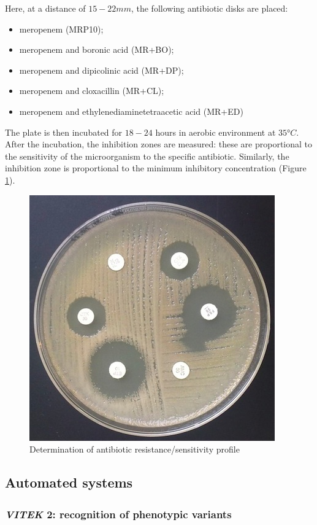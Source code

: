 \documentclass[11pt]{report}
\begin{document}
Here, at a distance of $15-22 mm$, the following antibiotic disks are placed:
\begin{itemize}
\item meropenem (MRP10);
\item meropenem and boronic acid (MR+BO);
\item meropenem and dipicolinic acid (MR+DP);
\item meropenem and cloxacillin (MR+CL);
\item meropenem and ethylenediaminetetraacetic acid (MR+ED)
\end{itemize}

The plate is then incubated for $18-24$ hours in aerobic environment at $35°C$.
After the incubation, the inhibition zones are measured: these are proportional to the sensitivity of the microorganism to the specific antibiotic.
Similarly, the inhibition zone is proportional to the minimum inhibitory concentration (Figure \ref{5disks}).

\begin{figure}[htp]
\centering
\includegraphics[scale=0.93]{img/5disks.jpg}
\caption{Determination of antibiotic resistance/sensitivity profile}
\label{5disks}
\end{figure}

\clearpage
\subsection{Automated systems}
\subsubsection{\emph{VITEK}\textsuperscript{\textregistered} 2: recognition of phenotypic variants}
\end{document}
